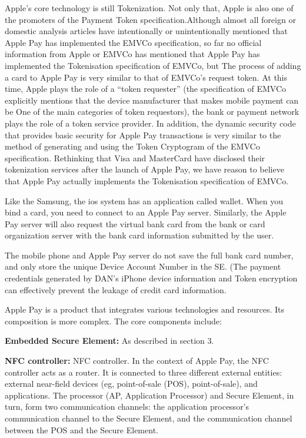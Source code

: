 \documentclass[journal]{IEEEtran}
\begin{document}
Apple's core technology is still Tokenization. Not only that, Apple is also one of the promoters of the Payment Token specification.Although almost all foreign or domestic analysis articles have intentionally or unintentionally mentioned that Apple Pay has implemented the EMVCo specification, so far no official information from Apple or EMVCo has mentioned that Apple Pay has implemented the Tokenisation specification of EMVCo, but The process of adding a card to Apple Pay is very similar to that of EMVCo's request token. At this time, Apple plays the role of a “token requester” (the specification of EMVCo explicitly mentions that the device manufacturer that makes mobile payment can be One of the main categories of token requestors), the bank or payment network plays the role of a token service provider. In addition, the dynamic security code that provides basic security for Apple Pay transactions is very similar to the method of generating and using the Token Cryptogram of the EMVCo specification. Rethinking that Visa and MasterCard have disclosed their tokenization services after the launch of Apple Pay, we have reason to believe that Apple Pay actually implements the Tokenisation specification of EMVCo.

Like the Samsung, the ios system has an application called wallet. When you bind a card, you need to connect to an Apple Pay server. Similarly, the Apple Pay server will also request the virtual bank card from the bank or card organization server with the bank card information submitted by the user.

The mobile phone and Apple Pay server do not save the full bank card number, and only store the unique Device Account Number in the SE. (The payment credentials generated by DAN's iPhone device information and Token encryption can effectively prevent the leakage of credit card information.

Apple Pay is a product that integrates various technologies and resources. Its composition is more complex. The core components include:



\textbf{Embedded Secure Element:} As described in section 3.
    
    \textbf{NFC controller:} NFC controller. In the context of Apple Pay, the NFC controller acts as a router. It is connected to three different external entities: external near-field devices (eg, point-of-sale (POS), point-of-sale), and applications. The processor (AP, Application Processor) and Secure Element, in turn, form two communication channels: the application processor's communication channel to the Secure Element, and the communication channel between the POS and the Secure Element.
    
\end{document}
